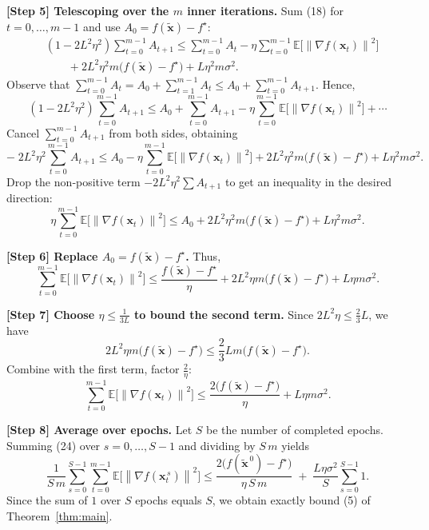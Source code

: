\documentclass{article}
\newcommand{\EE}{\mathbb{E}}
\newcommand{\norm}[1]{\left\|#1\right\|}
\newcommand{\grad}{\nabla}
\begin{document}
\noindent\textbf{[Step 5] Telescoping over the $m$ inner iterations.}
Sum (18) for $t=0,\dots,m-1$ and use $A_{0}=f(\tilde{\mathbf{x}})-f^{\star}$:
\[
\begin{aligned}
&(1-2L^{2}\eta^{2})\sum_{t=0}^{m-1}A_{t+1}
\le \sum_{t=0}^{m-1}A_{t}
-\eta\sum_{t=0}^{m-1}\EE\!\big[\norm{\grad f(\mathbf{x}_{t})}^{2}\big]\\
&\qquad
+2L^{2}\eta^{2}m\big(f(\tilde{\mathbf{x}})-f^{\star}\big)
+L\eta^{2}m\sigma^{2}.
\end{aligned}
\tag{19}
\]
Observe that $\sum_{t=0}^{m-1}A_{t}
= A_{0}+\sum_{t=1}^{m-1}A_{t}
\le A_{0}+ \sum_{t=0}^{m-1}A_{t+1}$.
Hence,
\[
(1-2L^{2}\eta^{2})\sum_{t=0}^{m-1}A_{t+1}
\le A_{0}+\sum_{t=0}^{m-1}A_{t+1}
-\eta\sum_{t=0}^{m-1}\EE\!\big[\norm{\grad f(\mathbf{x}_{t})}^{2}\big]
+\cdots
\tag{20}
\]
Cancel $\sum_{t=0}^{m-1}A_{t+1}$ from both sides, obtaining
\[
-\;2L^{2}\eta^{2}\sum_{t=0}^{m-1}A_{t+1}
\le A_{0}
-\eta\sum_{t=0}^{m-1}\EE\!\big[\norm{\grad f(\mathbf{x}_{t})}^{2}\big]
+2L^{2}\eta^{2}m\big(f(\tilde{\mathbf{x}})-f^{\star}\big)
+L\eta^{2}m\sigma^{2}.
\tag{21}
\]
Drop the non‑positive term $-2L^{2}\eta^{2}\sum A_{t+1}$ to get an inequality in the
desired direction:
\[
\eta\sum_{t=0}^{m-1}\EE\!\big[\norm{\grad f(\mathbf{x}_{t})}^{2}\big]
\le A_{0}
+2L^{2}\eta^{2}m\big(f(\tilde{\mathbf{x}})-f^{\star}\big)
+L\eta^{2}m\sigma^{2}.
\tag{22}
\]

\noindent\textbf{[Step 6] Replace $A_{0}=f(\tilde{\mathbf{x}})-f^{\star}$.}
Thus,
\[
\sum_{t=0}^{m-1}\EE\!\big[\norm{\grad f(\mathbf{x}_{t})}^{2}\big]
\le
\frac{f(\tilde{\mathbf{x}})-f^{\star}}{\eta}
+2L^{2}\eta m\big(f(\tilde{\mathbf{x}})-f^{\star}\big)
+L\eta m\sigma^{2}.
\tag{23}
\]

\noindent\textbf{[Step 7] Choose $\eta\le\frac{1}{3L}$ to bound the second term.}
Since $2L^{2}\eta\le\frac{2}{3}L$, we have
\[
2L^{2}\eta m\big(f(\tilde{\mathbf{x}})-f^{\star}\big)
\le \frac{2}{3}L m\big(f(\tilde{\mathbf{x}})-f^{\star}\big).
\]
Combine with the first term, factor $ \frac{2}{\eta}$:
\[
\sum_{t=0}^{m-1}\EE\!\big[\norm{\grad f(\mathbf{x}_{t})}^{2}\big]
\le
\frac{2\big(f(\tilde{\mathbf{x}})-f^{\star}\big)}{\eta}
+L\eta m\sigma^{2}.
\tag{24}
\]

\noindent\textbf{[Step 8] Average over epochs.}
Let $S$ be the number of completed epochs.
Summing (24) over $s=0,\dots,S-1$ and dividing by $S\,m$ yields
\[
\frac{1}{S\,m}\sum_{s=0}^{S-1}\sum_{t=0}^{m-1}
\EE\!\big[\norm{\grad f(\mathbf{x}_{t}^{\,s})}^{2}\big]
\le
\frac{2\big(f(\tilde{\mathbf{x}}^{\,0})-f^{\star}\big)}{\eta\,S\,m}
\;+\;
\frac{L\eta\sigma^{2}}{S}\sum_{s=0}^{S-1}1.
\]
Since the sum of $1$ over $S$ epochs equals $S$, we obtain exactly bound (5) of
Theorem~\ref{thm:main}.
\end{document}
